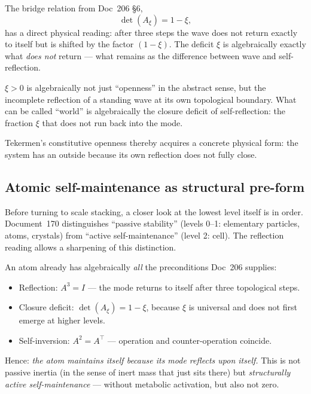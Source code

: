 The bridge relation from Doc~206 \S6,
\begin{equation}
\det(A_\xi) = 1 - \xi,
\end{equation}
has a direct physical reading: after three steps the wave does not return exactly to itself but is shifted by the factor $(1-\xi)$. The deficit $\xi$ is algebraically exactly what \emph{does not} return --- what remains as the difference between wave and self-reflection.

\begin{important}
$\xi > 0$ is algebraically not just ``openness'' in the abstract sense, but the incomplete reflection of a standing wave at its own topological boundary. What can be called ``world'' is algebraically the closure deficit of self-reflection: the fraction $\xi$ that does not run back into the mode.

Tekermen's constitutive openness thereby acquires a concrete physical form: the system has an outside because its own reflection does not fully close.
\end{important}

\subsection{Atomic self-maintenance as structural pre-form}\label{sec:reflection_atom}

Before turning to scale stacking, a closer look at the lowest level itself is in order. Document~170 distinguishes ``passive stability'' (levels 0--1: elementary particles, atoms, crystals) from ``active self-maintenance'' (level 2: cell). The reflection reading allows a sharpening of this distinction.

An atom already has algebraically \emph{all} the preconditions Doc~206 supplies:

\begin{itemize}
\item Reflection: $A^3 = I$ --- the mode returns to itself after three topological steps.
\item Closure deficit: $\det(A_\xi) = 1 - \xi$, because $\xi$ is universal and does not first emerge at higher levels.
\item Self-inversion: $A^2 = A^\top$ --- operation and counter-operation coincide.
\end{itemize}

Hence: \emph{the atom maintains itself because its mode reflects upon itself.} This is not passive inertia (in the sense of inert mass that just sits there) but \emph{structurally active self-maintenance} --- without metabolic activation, but also not zero.

